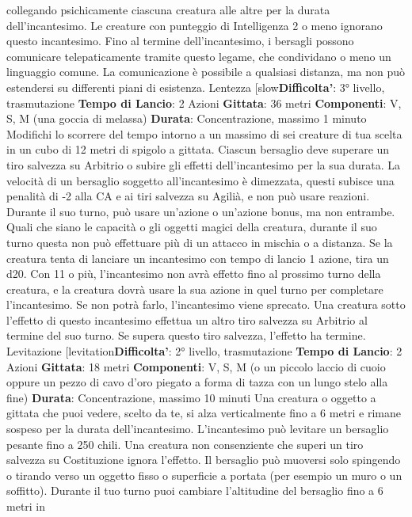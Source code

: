 \begin{multicols}{2}
collegando psichicamente ciascuna creatura alle altre
per la durata dell’incantesimo. Le creature con
punteggio di Intelligenza 2 o meno ignorano questo
incantesimo.
Fino al termine dell’incantesimo, i bersagli possono
comunicare telepaticamente tramite questo legame,
che condividano o meno un linguaggio comune. La
comunicazione è possibile a qualsiasi distanza, ma non
può estendersi su differenti piani di esistenza.
Lentezza
[slow\textbf{Difficolta'}:
3° livello, trasmutazione
\textbf{Tempo di Lancio}: 2 Azioni
\textbf{Gittata}: 36 metri
\textbf{Componenti}: V, S, M (una goccia di melassa)
\textbf{Durata}: Concentrazione, massimo 1 minuto
Modifichi lo scorrere del tempo intorno a un massimo di
sei creature di tua scelta in un cubo di 12 metri di
spigolo a gittata. Ciascun bersaglio deve superare un
tiro salvezza su Arbitrio o subire gli effetti
dell’incantesimo per la sua durata.
La velocità di un bersaglio soggetto all’incantesimo è
dimezzata, questi subisce una penalità di -2 alla CA e ai
tiri salvezza su Agilià, e non può usare reazioni.
Durante il suo turno, può usare un’azione o un’azione
bonus, ma non entrambe. Quali che siano le capacità o
gli oggetti magici della creatura, durante il suo turno
questa non può effettuare più di un attacco in mischia o
a distanza.
Se la creatura tenta di lanciare un incantesimo con
tempo di lancio 1 azione, tira un d20. Con 11 o più,
l’incantesimo non avrà effetto fino al prossimo turno
della creatura, e la creatura dovrà usare la sua azione
in quel turno per completare l’incantesimo. Se non potrà
farlo, l’incantesimo viene sprecato.
Una creatura sotto l’effetto di questo incantesimo
effettua un altro tiro salvezza su Arbitrio al termine
del suo turno. Se supera questo tiro salvezza, l’effetto
ha termine.
Levitazione
[levitation\textbf{Difficolta'}:
2° livello, trasmutazione
\textbf{Tempo di Lancio}: 2 Azioni
\textbf{Gittata}: 18 metri
\textbf{Componenti}: V, S, M (o un piccolo laccio di cuoio
oppure un pezzo di cavo d’oro piegato a forma di tazza
con un lungo stelo alla fine)
\textbf{Durata}: Concentrazione, massimo 10 minuti
Una creatura o oggetto a gittata che puoi vedere, scelto
da te, si alza verticalmente fino a 6 metri e rimane
sospeso per la durata dell’incantesimo. L’incantesimo
può levitare un bersaglio pesante fino a 250 chili. Una
creatura non consenziente che superi un tiro salvezza
su Costituzione ignora l’effetto.
Il bersaglio può muoversi solo spingendo o tirando
verso un oggetto fisso o superficie a portata (per
esempio un muro o un soffitto). Durante il tuo turno puoi
cambiare l’altitudine del bersaglio fino a 6 metri in

\end{multicols}
